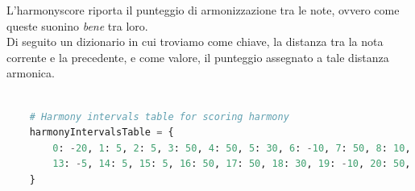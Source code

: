\documentclass[a4paper,12pt]{report}
\begin{document}
L'harmonyscore riporta il punteggio di armonizzazione tra le note, ovvero come queste suonino \textit{bene} tra loro. \\
Di seguito un dizionario in cui troviamo come chiave, la distanza tra la nota corrente e la precedente, e come valore, il punteggio assegnato a tale distanza armonica.

\begin{lstlisting}[language=Python]

    # Harmony intervals table for scoring harmony
    harmonyIntervalsTable = {
        0: -20, 1: 5, 2: 5, 3: 50, 4: 50, 5: 30, 6: -10, 7: 50, 8: 10, 9: 40, 10: -2, 11: -2, 12: 10,
        13: -5, 14: 5, 15: 5, 16: 50, 17: 50, 18: 30, 19: -10, 20: 50, 21: 10, 22: 40, 23: -2, 24: -2, 25: 10
    }

\end{lstlisting}
\end{document}

